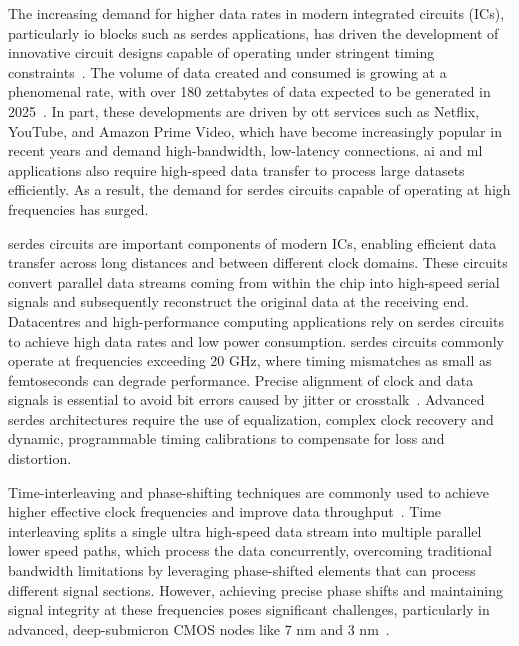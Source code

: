 The increasing demand for higher data rates in modern integrated circuits (ICs), particularly \gls{io} blocks such as \gls{serdes} applications, has driven the development of innovative circuit designs capable of operating under stringent timing constraints~\cite{horowitz2005scaling,seok2010progress}. The volume of data created and consumed is growing at a phenomenal rate, with over 180 zettabytes of data expected to be generated in 2025~\cite{consultancy2024data}. In part, these developments are driven by \gls{ott} services such as Netflix, YouTube, and Amazon Prime Video, which have become increasingly popular in recent years and demand high-bandwidth, low-latency connections. \gls{ai} and \gls{ml} applications also require high-speed data transfer to process large datasets efficiently. As a result, the demand for \gls{serdes} circuits capable of operating at high frequencies has surged.

\gls{serdes} circuits are important components of modern ICs, enabling efficient data transfer across long distances and between different clock domains. These circuits convert parallel data streams coming from within the chip into high-speed serial signals and subsequently reconstruct the original data at the receiving end. Datacentres and high-performance computing applications rely on \gls{serdes} circuits to achieve high data rates and low power consumption. \gls{serdes} circuits commonly operate at frequencies exceeding 20 GHz, where timing mismatches as small as femtoseconds can degrade performance. Precise alignment of clock and data signals is essential to avoid bit errors caused by jitter or crosstalk~\cite{lee2011self,nakamura2022high}. Advanced \gls{serdes} architectures require the use of equalization, complex clock recovery and dynamic, programmable timing calibrations to compensate for loss and distortion.

Time-interleaving and phase-shifting techniques are commonly used to achieve higher effective clock frequencies and improve data throughput~\cite{Razavi2009PLL}. Time interleaving splits a single ultra high-speed data stream into multiple parallel lower speed paths, which process the data concurrently, overcoming traditional bandwidth limitations by leveraging phase-shifted elements that can process different signal sections. However, achieving precise phase shifts and maintaining signal integrity at these frequencies poses significant challenges, particularly in advanced, deep-submicron CMOS nodes like 7 nm and 3 nm~\cite{loke2019nanoscale,caignet2001challenge}.


